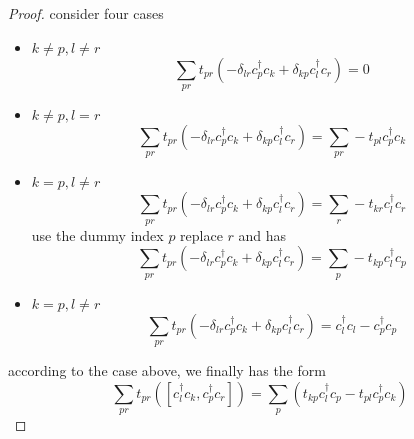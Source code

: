 \begin{proof}
    consider four cases
    \begin{itemize}
      \item $k\neq p, l \neq r$ \[\sum_{pr}t_{pr}\left(-\delta_{lr}c_p^\dagger c_k + \delta_{kp}c_l^\dagger c_r\right)=0\]
      \item $k\neq p, l = r$  \[\sum_{pr}t_{pr}\left(-\delta_{lr}c_p^\dagger c_k + \delta_{kp}c_l^\dagger c_r\right)=\sum_{pr}-t_{pl}c_p^\dagger c_k\]
      \item $k = p, l \neq r$ \[\sum_{pr}t_{pr}\left(-\delta_{lr}c_p^\dagger c_k + \delta_{kp}c_l^\dagger c_r\right)=\sum_{r}-t_{kr}c_l^\dagger c_r\]
            use the dummy index $p$ replace $r$ and has
            \[\sum_{pr}t_{pr}\left(-\delta_{lr}c_p^\dagger c_k + \delta_{kp}c_l^\dagger c_r\right)=\sum_{p}-t_{kp}c_l^\dagger c_p\]
      \item $k = p, l \neq r$ \[ \sum_{pr}t_{pr}\left(-\delta_{lr}c_p^\dagger c_k + \delta_{kp}c_l^\dagger c_r\right) = c_l^\dagger c_l - c_p^\dagger c_p\]
    \end{itemize}
    according to the case above, we finally has the form
    \begin{equation}
      \sum_{pr}t_{pr}\left([c_l^\dagger c_k, c_p^\dagger c_r]\right) = \sum_{p}(t_{kp}c_l^\dagger c_p-t_{pl}c_p^\dagger c_k) \label{tdhf12}
    \end{equation}


\end{proof}
